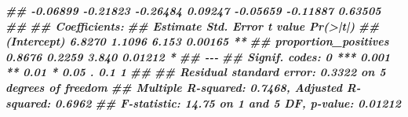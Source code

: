 \documentclass[
  11pt,
  oneside]{book}
\newenvironment{Shaded}{\begin{snugshade}}{\end{snugshade}}
\newcommand{\DocumentationTok}[1]{\textcolor[rgb]{0.56,0.35,0.01}{\textbf{\textit{#1}}}}
\begin{document}
\begin{Shaded}
\begin{Highlighting}[]
\DocumentationTok{\#\# {-}0.06899 {-}0.21823 {-}0.26484  0.09247 {-}0.05659 {-}0.11887  0.63505 }
\DocumentationTok{\#\# }
\DocumentationTok{\#\# Coefficients:}
\DocumentationTok{\#\#                      Estimate Std. Error t value Pr(\textgreater{}|t|)   }
\DocumentationTok{\#\# (Intercept)            6.8270     1.1096   6.153  0.00165 **}
\DocumentationTok{\#\# proportion\_positives   0.8676     0.2259   3.840  0.01212 * }
\DocumentationTok{\#\# {-}{-}{-}}
\DocumentationTok{\#\# Signif. codes:  0 \textquotesingle{}***\textquotesingle{} 0.001 \textquotesingle{}**\textquotesingle{} 0.01 \textquotesingle{}*\textquotesingle{} 0.05 \textquotesingle{}.\textquotesingle{} 0.1 \textquotesingle{} \textquotesingle{} 1}
\DocumentationTok{\#\# }
\DocumentationTok{\#\# Residual standard error: 0.3322 on 5 degrees of freedom}
\DocumentationTok{\#\# Multiple R{-}squared:  0.7468, Adjusted R{-}squared:  0.6962 }
\DocumentationTok{\#\# F{-}statistic: 14.75 on 1 and 5 DF,  p{-}value: 0.01212}


\end{Highlighting}
\end{Shaded}
\end{document}
